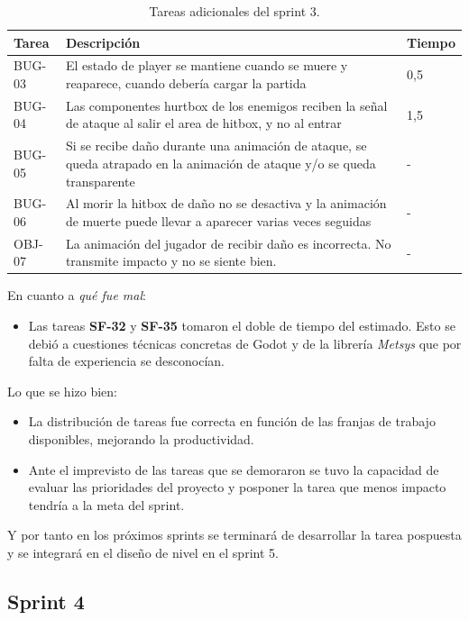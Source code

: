 \begin{table}[!ht]
    \centering
    \begin{tabular}{|l|p{8cm}|l|}
    \hline
        Tarea & Descripción & Tiempo \\ \hline
        BUG-03 & El estado de player se mantiene cuando se muere y reaparece, cuando debería cargar la partida & 0,5 \\ \hline
        BUG-04 & Las componentes hurtbox de los enemigos reciben la señal de ataque al salir el area de hitbox, y no al entrar & 1,5 \\ \hline
        BUG-05 & Si se recibe daño durante una animación de ataque, se queda atrapado en la animación de ataque y/o se queda transparente & - \\ \hline
        BUG-06 & Al morir la hitbox de daño no se desactiva y la animación de muerte puede llevar a aparecer varias veces seguidas & - \\ \hline
        OBJ-07 & La animación del jugador de recibir daño es incorrecta. No transmite impacto y no se siente bien. & - \\ \hline
    \end{tabular}
    \caption{Tareas adicionales del sprint 3.}
    \label{tab:aditionalsprint3task}
\end{table}

En cuanto a \textit{qué fue mal}:
\begin{itemize}
    \item Las tareas \textbf{SF-32} y \textbf{SF-35} tomaron el doble de tiempo del estimado. Esto se debió a cuestiones técnicas concretas de Godot y de la librería \textit{Metsys} que por falta de experiencia se desconocían.
\end{itemize}

Lo que se hizo bien:
\begin{itemize}
    \item La distribución de tareas fue correcta en función de las franjas de trabajo disponibles, mejorando la productividad.
    \item Ante el imprevisto de las tareas que se demoraron se tuvo la capacidad de evaluar las prioridades del proyecto y posponer la tarea que menos impacto tendría a la meta del sprint.
\end{itemize}

Y por tanto en los próximos sprints se terminará de desarrollar la tarea pospuesta y se integrará en el diseño de nivel en el sprint 5.


\subsection{Sprint 4}

